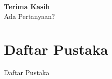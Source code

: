 \documentclass[aspectratio=169, 10pt]{beamer}
\begin{document}
	\begin{frame}
		\centering
		\Huge \textbf{Terima Kasih} \\
		\vspace{0.5cm}
		\large Ada Pertanyaan?
	\end{frame}

	\section{Daftar Pustaka}
	\begin{frame}{Daftar Pustaka}
		\footnotesize
		\printbibliography[heading=none]
	\end{frame}
\end{document}
